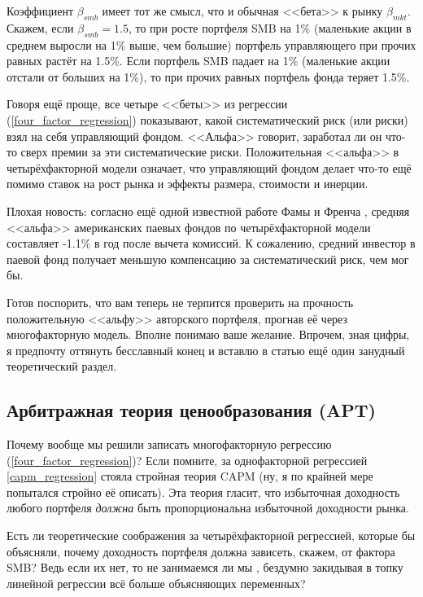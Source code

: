 Коэффициент $\beta_{smb}$ имеет тот же смысл, что и обычная <<бета>> к рынку 
$\beta_{mkt}$. Скажем, если $\beta_{smb}=1.5$, то при росте портфеля SMB на 1\% 
(маленькие акции в среднем выросли на 1\% выше, чем большие) портфель 
управляющего при прочих равных растёт на 1.5\%. Если портфель SMB падает на 1\% 
(маленькие акции отстали от больших на 1\%), то при прочих равных портфель фонда 
теряет 1.5\%.

Говоря ещё проще, все четыре <<беты>> из регрессии 
(\ref{four_factor_regression}) показывают, какой систематический риск (или 
риски) взял на себя управляющий фондом. <<Альфа>> говорит, заработал ли он что-
то сверх премии за эти систематические риски. Положительная <<альфа>> в 
четырёхфакторной модели означает, что управляющий фондом делает что-то ещё 
помимо ставок на рост рынка и эффекты размера, стоимости и инерции.

Плохая новость: согласно ещё одной известной работе Фамы и Френча 
\cite{fama2010luck}, средняя <<альфа>> американских паевых фондов по 
четырёхфакторной модели составляет -1.1\% в год после вычета комиссий. К 
сожалению, средний инвестор в паевой фонд получает меньшую компенсацию за 
систематический риск, чем мог бы.

Готов поспорить, что вам теперь не терпится проверить на прочность положительную 
<<альфу>> авторского портфеля, прогнав её через многофакторную модель. Вполне 
понимаю ваше желание. Впрочем, зная цифры, я предпочту оттянуть бесславный конец 
и вставлю в статью ещё один занудный теоретический раздел.

\subsection{Арбитражная теория ценообразования (APT)}

Почему вообще мы решили записать многофакторную регрессию 
(\ref{four_factor_regression})? Если помните, за однофакторной регрессией 
\ref{capm_regression} стояла стройная теория CAPM (ну, я по крайней мере 
попытался стройно её описать). Эта теория гласит, что избыточная доходность 
любого портфеля \emph{должна} быть пропорциональна избыточной доходности рынка.

Есть ли теоретические соображения за четырёхфакторной регрессией, которые бы 
объясняли, почему доходность портфеля должна зависеть, скажем, от фактора SMB? 
Ведь если их нет, то не занимаемся ли мы , 
бездумно закидывая в топку линейной регрессии всё больше объясняющих переменных?

